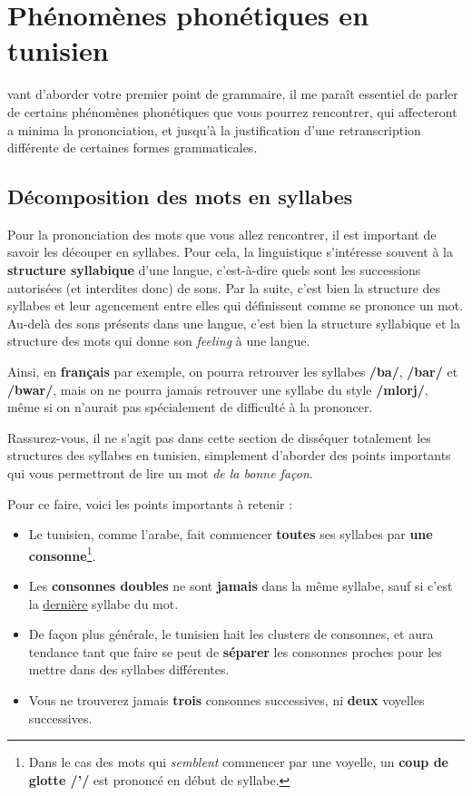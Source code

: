 \chapter{Phénomènes phonétiques en tunisien}
vant d'aborder votre premier point de grammaire, il me paraît essentiel de parler de certains phénomènes phonétiques que vous pourrez rencontrer, qui affecteront a minima la prononciation, et jusqu'à la justification d'une retranscription différente de certaines formes grammaticales.

\section{Décomposition des mots en syllabes}\label{DécompositionSyllabes}
Pour la prononciation des mots que vous allez rencontrer, il est important de savoir les découper en syllabes. Pour cela, la linguistique s'intéresse souvent à la \textbf{structure syllabique} d'une langue, c'est-à-dire quels sont les successions autorisées (et interdites donc) de sons. Par la suite, c'est bien la structure des syllabes et leur agencement entre elles qui définissent comme se prononce un mot. Au-delà des sons présents dans une langue, c'est bien la structure syllabique et la structure des mots qui donne son \textit{feeling} à une langue.

Ainsi, en \textbf{français} par exemple, on pourra retrouver les syllabes \textbf{/ba/}, \textbf{/bar/} et \textbf{/bwar/}, mais on ne pourra jamais retrouver une syllabe du style \textbf{/mlorj/}, même si on n'aurait pas spécialement de difficulté à la prononcer.

Rassurez-vous, il ne s'agit pas dans cette section de disséquer totalement les structures des syllabes en tunisien, simplement d'aborder des points importants qui vous permettront de lire un mot \textit{de la bonne façon}. 

Pour ce faire, voici les points importants à retenir : 
\begin{itemize}
    \item Le tunisien, comme l'arabe, fait commencer \textbf{toutes} ses syllabes par \textbf{une consonne}\footnote{Dans le cas des mots qui \textit{semblent} commencer par une voyelle, un \textbf{coup de glotte /'/} est prononcé en début de syllabe.}.
    \item Les \textbf{consonnes doubles} ne sont \textbf{jamais} dans la même syllabe, sauf si c'est la \underline{dernière} syllabe du mot.
    \item De façon plus générale, le tunisien hait les clusters de consonnes, et aura tendance tant que faire se peut de \textbf{séparer} les consonnes proches pour les mettre dans des syllabes différentes.
    \item Vous ne trouverez jamais \textbf{trois} consonnes successives, ni \textbf{deux} voyelles successives.
\end{itemize}

